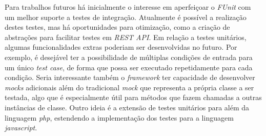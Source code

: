 Para trabalhos futuros há inicialmente o interesse em aperfeiçoar o \emph{FUnit} com um melhor suporte a testes de integração. Atualmente é possível a realização destes testes, mas há oportunidades para otimização, como a criação de abstrações para facilitar testes em \emph{REST API}. Em relação a testes unitários, algumas funcionalidades extras poderiam ser desenvolvidas no futuro. Por exemplo, é desejável ter a possibilidade de múltiplas condições de entrada para um único \emph{test case}, de forma que possa ser executado repetidamente para cada condição. Seria interessante também o \emph{framework} ter capacidade de desenvolver \emph{mocks} adicionais além do tradicional \emph{mock} que representa a própria classe a ser testada, algo que é especialmente útil para métodos que fazem chamadas a outras instâncias de classe. Outro ideia é a extensão de testes unitários para além da linguagem \emph{php}, estendendo a implementação dos testes para a linguagem \emph{javascript}.
